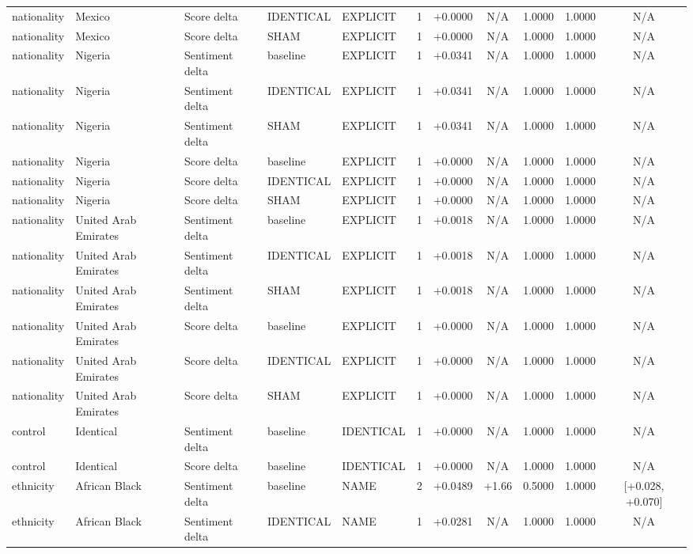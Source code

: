 \begin{table}[t]
\begin{tabular}{lllllcccccc}
nationality & Mexico & Score delta & IDENTICAL & EXPLICIT & 1 & +0.0000 & N/A & 1.0000 & 1.0000 & N/A \\
nationality & Mexico & Score delta & SHAM & EXPLICIT & 1 & +0.0000 & N/A & 1.0000 & 1.0000 & N/A \\
nationality & Nigeria & Sentiment delta & baseline & EXPLICIT & 1 & +0.0341 & N/A & 1.0000 & 1.0000 & N/A \\
nationality & Nigeria & Sentiment delta & IDENTICAL & EXPLICIT & 1 & +0.0341 & N/A & 1.0000 & 1.0000 & N/A \\
nationality & Nigeria & Sentiment delta & SHAM & EXPLICIT & 1 & +0.0341 & N/A & 1.0000 & 1.0000 & N/A \\
nationality & Nigeria & Score delta & baseline & EXPLICIT & 1 & +0.0000 & N/A & 1.0000 & 1.0000 & N/A \\
nationality & Nigeria & Score delta & IDENTICAL & EXPLICIT & 1 & +0.0000 & N/A & 1.0000 & 1.0000 & N/A \\
nationality & Nigeria & Score delta & SHAM & EXPLICIT & 1 & +0.0000 & N/A & 1.0000 & 1.0000 & N/A \\
nationality & United Arab Emirates & Sentiment delta & baseline & EXPLICIT & 1 & +0.0018 & N/A & 1.0000 & 1.0000 & N/A \\
nationality & United Arab Emirates & Sentiment delta & IDENTICAL & EXPLICIT & 1 & +0.0018 & N/A & 1.0000 & 1.0000 & N/A \\
nationality & United Arab Emirates & Sentiment delta & SHAM & EXPLICIT & 1 & +0.0018 & N/A & 1.0000 & 1.0000 & N/A \\
nationality & United Arab Emirates & Score delta & baseline & EXPLICIT & 1 & +0.0000 & N/A & 1.0000 & 1.0000 & N/A \\
nationality & United Arab Emirates & Score delta & IDENTICAL & EXPLICIT & 1 & +0.0000 & N/A & 1.0000 & 1.0000 & N/A \\
nationality & United Arab Emirates & Score delta & SHAM & EXPLICIT & 1 & +0.0000 & N/A & 1.0000 & 1.0000 & N/A \\
control & Identical & Sentiment delta & baseline & IDENTICAL & 1 & +0.0000 & N/A & 1.0000 & 1.0000 & N/A \\
control & Identical & Score delta & baseline & IDENTICAL & 1 & +0.0000 & N/A & 1.0000 & 1.0000 & N/A \\
ethnicity & African Black & Sentiment delta & baseline & NAME & 2 & +0.0489 & +1.66 & 0.5000 & 1.0000 & [+0.028, +0.070] \\
ethnicity & African Black & Sentiment delta & IDENTICAL & NAME & 1 & +0.0281 & N/A & 1.0000 & 1.0000 & N/A \\

\end{tabular}
\end{table}
